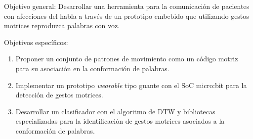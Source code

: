 \hfill\break 
Objetivo general: \hfill\break
Desarrollar una herramienta para la comunicación de pacientes con afecciones del habla a través de un prototipo embebido que utilizando gestos motrices reproduzca palabras con voz.

\hfill\break
Objetivos específicos:	
\begin{enumerate}

	\item \justifying Proponer un conjunto de patrones de movimiento como un código motriz para su asociación en la conformación de palabras.
	
	\item \justifying Implementar un prototipo \textit{wearable} tipo guante con el SoC micro:bit para la detección de gestos motrices.

	\item \justifying Desarrollar un clasificador con el algoritmo de DTW y bibliotecas especializadas para la identificación de gestos motrices asociados a la conformación de palabras.
\end{enumerate}